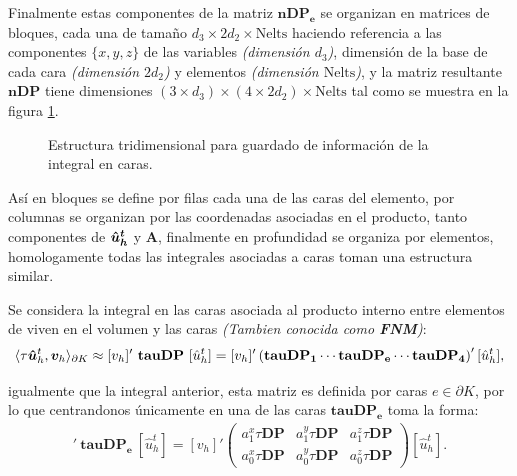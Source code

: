 \documentclass{article}
\begin{document}
\noindent Finalmente estas componentes de la matriz $\boldsymbol{nDP_e}$ se organizan en matrices de bloques, cada una de tamaño $d_3 \times 2 d_2 \times \text{Nelts}$ haciendo referencia a las componentes $\lbrace x, y, z \rbrace$ de las variables \textit{(dimensión $d_3$)}, dimensión de la base de cada cara \textit{(dimensión $2d_2$)} y elementos \textit{(dimensión $\text{Nelts}$)}, y la matriz resultante $\boldsymbol{nDP}$ tiene dimensiones $(3 \times d_3) \times (4 \times 2 d_2) \times \text{Nelts}$ tal como se muestra en la figura \ref{matrix3d}.

\begin{figure}[ht]
  \centering
  \resizebox{0.5\textwidth}{!}{}
  \caption{Estructura tridimensional para guardado de información de la integral en caras.}
  \label{matrix3d}
\end{figure}

\noindent Así en bloques se define por filas cada una de las caras del elemento, por columnas se organizan por las coordenadas asociadas en el producto, tanto componentes de $\boldsymbol{\hat{u}^t_h}$ y $\mathbf{A}$, finalmente en profundidad se organiza por elementos, homologamente todas las integrales asociadas a caras toman una estructura similar.

\noindent Se considera la integral en las caras asociada al producto interno entre elementos de viven en el volumen y las caras \textit{(Tambien conocida como \textbf{FNM})}:
\begin{equation*}
    \langle \tau\boldsymbol{\hat{u}}_h^t, \boldsymbol{v}_h \rangle_{\partial K} \approx
    [v_h]'~\mathbf{tauDP}~[\hat{u}_h^t]  =
    [v_h]' \left ( \mathbf{tauDP_1} \cdots \mathbf{tauDP_e} \cdots \mathbf{tauDP_4} \right )' [\hat{u}_h^t],
\end{equation*}

\noindent igualmente que la integral anterior, esta matriz es definida por caras $e \in \partial K$, por lo que centrandonos únicamente en una de las caras $\mathbf{tauDP_e}$ toma la forma:
\begin{align}
    [v_h]'~\mathbf{tauDP_e}~[\hat{u}_h^t]  =
    [v_h]'
    \left(
    \begin{array}{ccc}
        a_1^{x} \tau \mathbf{DP} & a_1^{y} \tau \mathbf{DP} & a_1^{z} \tau \mathbf{DP} \\
        a_0^{x} \tau \mathbf{DP} & a_0^{y} \tau \mathbf{DP} & a_0^{z} \tau \mathbf{DP}
    \end{array}
    \right)
    [\hat{u}_h^t].
\end{align}
\end{document}
